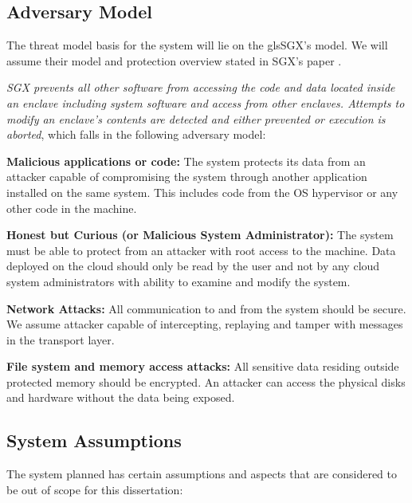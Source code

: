 \subsection{Adversary Model}
\label{ssec:adversary_model}

The threat model basis for the system will lie on the gls{SGX}'s model. We will assume their model and protection overview stated in \gls{SGX}'s paper \cite{sgx:7}.

\textit{SGX prevents all other software from accessing the code and data located inside an enclave including system software and access from other enclaves. Attempts to modify an enclave’s contents are detected and either prevented or execution is aborted}, \cite{sgx:7} which falls in the following adversary model:

\textbf{Malicious applications or code:} The system protects its data from an attacker capable of compromising the system through another application installed on the same system. This includes code from the \gls{OS} hypervisor or any other code in the machine.

\textbf{Honest but Curious (or Malicious System Administrator):} The system must be able to protect from an attacker with root access to the machine. Data deployed on the cloud should only be read by the user and not by any cloud system administrators with ability to examine and modify the system.

\textbf{Network Attacks:} All communication to and from the system should be secure. We assume attacker capable of intercepting, replaying and tamper with messages in the transport layer. 

\textbf{File system and memory access attacks:} All sensitive data residing outside protected memory should be encrypted. An attacker can access the physical disks and hardware without the data being exposed.

\subsection{System Assumptions}
\label{ssec:system_assumptions}

The system planned has certain assumptions and aspects that are considered to be out of scope for this dissertation:

